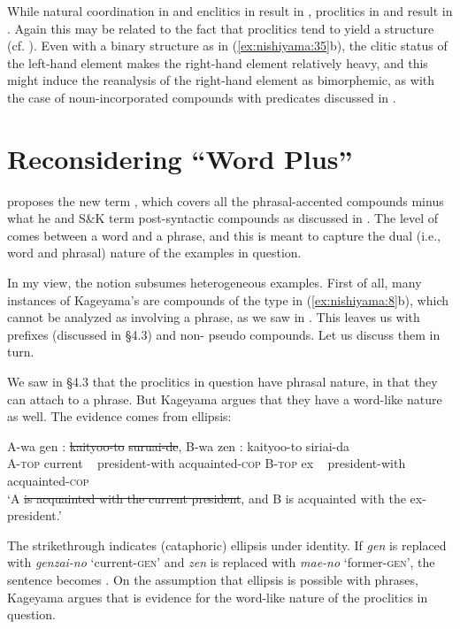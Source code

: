 \documentclass[output=paper]{LSP/langsci}
\begin{document}
While natural coordination in  and enclitics in  result in , proclitics in  and  result in . Again this may be related to the fact that proclitics tend to yield a  structure (cf. ). Even with a binary structure as in (\ref{ex:nishiyama:35}b), the clitic status of the left-hand element makes the right-hand element relatively heavy, and this might induce the reanalysis of the right-hand element as bimorphemic, as with the case of noun-incorporated compounds with  predicates discussed in .

\section{Reconsidering “Word Plus”}\label{sec:nishiyama:5}
\citet{Kageyama1993,Kageyama2001,Kageyama2009} proposes the new term , which covers all the phrasal-accented compounds minus what he and S\&K term post-syntactic compounds as discussed in . The level of  comes between a word and a phrase, and this is meant to capture the dual (i.e., word and phrasal) nature of the examples in question.

In my view, the notion  subsumes heterogeneous examples. First of all, many instances of Kageyama’s  are  compounds of the type in (\ref{ex:nishiyama:8}b), which cannot be analyzed as involving a phrase, as we saw in . This leaves us with prefixes (discussed in §4.3) and non- pseudo compounds. Let us discuss them in turn.

We saw in §4.3 that the proclitics in question have phrasal nature, in that they can attach to a phrase. But Kageyama argues that they have a word-like nature as well. The evidence comes from ellipsis:

\ea\label{ex:nishiyama:38}
\gll  *A-wa gen :   \st{kaityoo-to}    \st{suruai-de},    B-wa zen : kaityoo-to    siriai-da\\
  A-\textsc{top} current ~ president-with acquainted-\textsc{cop}  B-\textsc{top} ex ~ president-with  acquainted-\textsc{cop}\\
\glt  ‘A \st{is acquainted with the current president}, and B is acquainted with the ex-president.’
\citep[251]{Kageyama2001}
\z

The strikethrough indicates (cataphoric) ellipsis under identity. If \textit{gen} is replaced with \textit{genzai-no} ‘current-\textsc{gen}’ and \textit{zen} is replaced with \textit{mae-no} ‘former-\textsc{gen}’, the sentence becomes . On the assumption that ellipsis is possible with phrases, Kageyama argues that  is evidence for the word-like nature of the proclitics in question.
\end{document}
